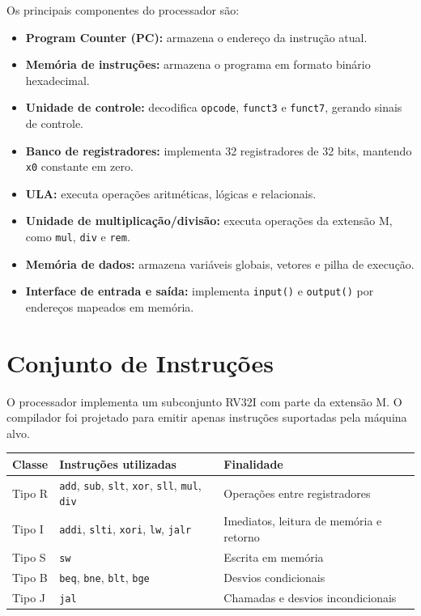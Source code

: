 \documentclass[12pt,a4paper]{report}
\begin{document}
Os principais componentes do processador são:

\begin{itemize}
    \item \textbf{Program Counter (PC):} armazena o endereço da instrução atual.
    \item \textbf{Memória de instruções:} armazena o programa em formato binário hexadecimal.
    \item \textbf{Unidade de controle:} decodifica \texttt{opcode}, \texttt{funct3} e \texttt{funct7}, gerando sinais de controle.
    \item \textbf{Banco de registradores:} implementa 32 registradores de 32 bits, mantendo \texttt{x0} constante em zero.
    \item \textbf{ULA:} executa operações aritméticas, lógicas e relacionais.
    \item \textbf{Unidade de multiplicação/divisão:} executa operações da extensão M, como \texttt{mul}, \texttt{div} e \texttt{rem}.
    \item \textbf{Memória de dados:} armazena variáveis globais, vetores e pilha de execução.
    \item \textbf{Interface de entrada e saída:} implementa \texttt{input()} e \texttt{output()} por endereços mapeados em memória.
\end{itemize}

\section{Conjunto de Instruções}

O processador implementa um subconjunto RV32I com parte da extensão M. O compilador foi projetado para emitir apenas instruções suportadas pela máquina alvo.

\begin{longtable}{lll}
\toprule
Classe & Instruções utilizadas & Finalidade \\
\midrule
Tipo R & \texttt{add}, \texttt{sub}, \texttt{slt}, \texttt{xor}, \texttt{sll}, \texttt{mul}, \texttt{div} & Operações entre registradores \\
Tipo I & \texttt{addi}, \texttt{slti}, \texttt{xori}, \texttt{lw}, \texttt{jalr} & Imediatos, leitura de memória e retorno \\
Tipo S & \texttt{sw} & Escrita em memória \\
Tipo B & \texttt{beq}, \texttt{bne}, \texttt{blt}, \texttt{bge} & Desvios condicionais \\
Tipo J & \texttt{jal} & Chamadas e desvios incondicionais \\
\bottomrule
\end{longtable}
\end{document}
